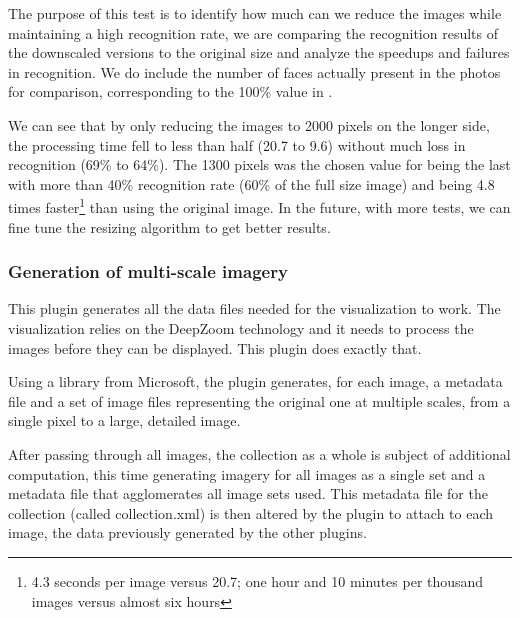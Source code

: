 The purpose of this test is to identify how much can we reduce the images while maintaining a high recognition rate, we are comparing the recognition results of the downscaled versions to the original size and analyze the speedups and failures in recognition. We do include the number of faces actually present in the photos for comparison, corresponding to the 100\% value in .

We can see that by only reducing the images to 2000 pixels on the longer side, the processing time fell to less than half (20.7 to 9.6) without much loss in recognition (69\% to 64\%). The 1300 pixels was the chosen value for being the last with more than 40\% recognition rate (60\% of the full size image) and being 4.8 times faster\footnote{4.3 seconds per image versus 20.7; one hour and 10 minutes per thousand images versus almost six hours} than using the original image. In the future, with more tests, we can fine tune the resizing algorithm to get better results.





\subsubsection{Generation of multi-scale imagery}

This plugin generates all the data files needed for the visualization to work. The visualization relies on the DeepZoom technology and it needs to process the images before they can be displayed. This plugin does exactly that.


Using a library from Microsoft, the plugin generates, for each image, a metadata file and a set of image files representing the original one at multiple scales, from a single pixel to a large, detailed image.

After passing through all images, the collection as a whole is subject of additional computation, this time generating imagery for all images as a single set and a metadata file that agglomerates all image sets used. This metadata file for the collection (called collection.xml) is then altered by the plugin to attach to each image, the data previously generated by the other plugins.

